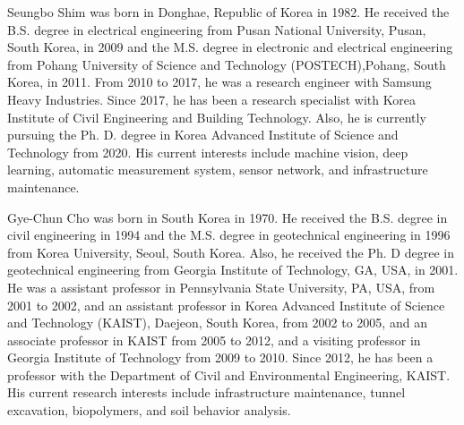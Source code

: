 \documentclass{ieeeaccess}
\begin{document}
\begin{IEEEbiography}{Seungbo Shim} was born in Donghae, Republic of Korea in 1982. He received the B.S. degree in electrical engineering from Pusan National University, Pusan, South Korea, in 2009 and the M.S. degree in electronic and electrical engineering from Pohang University of Science and Technology (POSTECH),Pohang, South Korea, in 2011.
From 2010 to 2017, he was a research engineer with Samsung Heavy Industries. Since 2017, he has been a research specialist with Korea Institute of Civil Engineering and Building Technology. Also, he is currently pursuing the Ph. D. degree in Korea Advanced Institute of Science and Technology from 2020. His current interests include machine vision, deep learning, automatic measurement system, sensor network, and infrastructure maintenance.
\end{IEEEbiography}

\begin{IEEEbiography}{Gye-Chun Cho} was born in South Korea in 1970. He received the B.S. degree in civil engineering in 1994 and the M.S. degree in geotechnical engineering in 1996 from Korea University, Seoul, South Korea. Also, he received the Ph. D degree in geotechnical engineering from Georgia Institute of Technology, GA, USA, in 2001. He was a assistant professor in Pennsylvania State University, PA, USA, from 2001 to 2002, and an assistant professor in Korea Advanced Institute of Science and Technology (KAIST), Daejeon, South Korea, from 2002 to 2005, and an associate professor in KAIST from 2005 to 2012, and a visiting professor in Georgia Institute of Technology from 2009 to 2010. Since 2012, he has been a professor with the Department of Civil and Environmental Engineering, KAIST. His current research interests include infrastructure maintenance, tunnel excavation, biopolymers, and soil behavior analysis. 
\end{IEEEbiography}

\EOD
\end{document}
